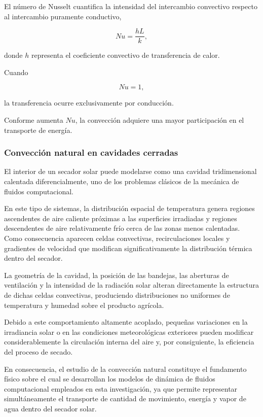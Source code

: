 El número de Nusselt cuantifica la intensidad del intercambio convectivo respecto al intercambio puramente conductivo,

\begin{equation}
Nu=
\frac{hL}{k},
\end{equation}

donde $h$ representa el coeficiente convectivo de transferencia de calor.

Cuando

\[
Nu=1,
\]

la transferencia ocurre exclusivamente por conducción.

Conforme aumenta $Nu$, la convección adquiere una mayor participación en el transporte de energía.


\subsubsection{Convección natural en cavidades cerradas}

El interior de un secador solar puede modelarse como una cavidad tridimensional calentada diferencialmente, uno de los problemas clásicos de la mecánica de fluidos computacional.

En este tipo de sistemas, la distribución espacial de temperatura genera regiones ascendentes de aire caliente próximas a las superficies irradiadas y regiones descendentes de aire relativamente frío cerca de las zonas menos calentadas. Como consecuencia aparecen celdas convectivas, recirculaciones locales y gradientes de velocidad que modifican significativamente la distribución térmica dentro del secador.

La geometría de la cavidad, la posición de las bandejas, las aberturas de ventilación y la intensidad de la radiación solar alteran directamente la estructura de dichas celdas convectivas, produciendo distribuciones no uniformes de temperatura y humedad sobre el producto agrícola.

Debido a este comportamiento altamente acoplado, pequeñas variaciones en la irradiancia solar o en las condiciones meteorológicas exteriores pueden modificar considerablemente la circulación interna del aire y, por consiguiente, la eficiencia del proceso de secado.

En consecuencia, el estudio de la convección natural constituye el fundamento físico sobre el cual se desarrollan los modelos de dinámica de fluidos computacional empleados en esta investigación, ya que permite representar simultáneamente el transporte de cantidad de movimiento, energía y vapor de agua dentro del secador solar.

